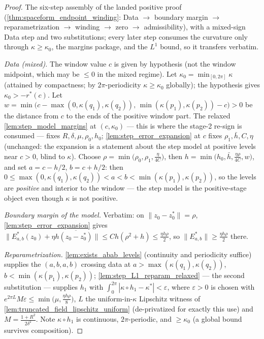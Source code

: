 \begin{proof}
        \leanok
  The six-step assembly of the landed positive proof
  (\cref{thm:spaceform_endpoint_winding}: Data $\to$ boundary margin $\to$
  reparametrization $\to$ winding $\to$ zero $\to$ admissibility), with a
  mixed-sign Data step and two substitutions; every later step consumes the
  curvature only through $\kappa\ge\kappa_0$, the margins package, and the
  $L^1$ bound, so it transfers verbatim.

  \emph{Data (mixed).} The window value $c$ is given by hypothesis (not the
  window midpoint, which may be $\le0$ in the mixed regime). Let
  $\kappa_0=\min_{[0,2\pi]}\kappa$ (attained by compactness; by
  $2\pi$-periodicity $\kappa\ge\kappa_0$ globally); the hypothesis gives
  $\kappa_0>-r^\ast(c)$. Let
  $w=\min\bigl(c-\max(0,\kappa(q_1),\kappa(q_2)),\,
  \min(\kappa(p_1),\kappa(p_2))-c\bigr)>0$ be the distance from $c$ to the
  ends of the positive window part. The relaxed
  \cref{lem:step_model_margins} at $(c,\kappa_0)$ — this is where the
  stage-2 re-sign is consumed — fixes $R,\delta,\mu,\rho_0,h_0$;
  \cref{lem:step_error_expansion} at $c$ fixes $\rho_1,\bar h,C,\eta$
  (unchanged: the expansion is a statement about the step model at positive
  levels near $c>0$, blind to $\kappa$). Choose
  $\rho=\min\bigl(\rho_0,\rho_1,\tfrac{\eta}{4C}\bigr)$, then
  $h=\min\bigl(h_0,\bar h,\tfrac{\eta\rho}{4C},w\bigr)$, and set
  $a=c-h/2$, $b=c+h/2$: then
  $0\le\max(0,\kappa(q_1),\kappa(q_2))<a<b<\min(\kappa(p_1),\kappa(p_2))$,
  so the levels are \emph{positive} and interior to the window — the step
  model is the positive-stage object even though $\kappa$ is not positive.

  \emph{Boundary margin of the model.} Verbatim: on
  $\|z_0-z_0^\ast\|=\rho$, \cref{lem:step_error_expansion} gives
  $\|E^\ast_{a,b}(z_0)+\eta h\overline{(z_0-z_0^\ast)}\|\le
  Ch(\rho^2+h)\le\tfrac{\eta h\rho}{2}$, so
  $\|E^\ast_{a,b}\|\ge\tfrac{\eta h\rho}{2}$ there.

  \emph{Reparametrization.} \cref{lem:exists_abab_levels} (continuity and
  periodicity suffice) supplies the $(a,b,a,b)$ crossing data at
  $a>\max(\kappa(q_1),\kappa(q_2))$, $b<\min(\kappa(p_1),\kappa(p_2))$;
  \cref{lem:step_L1_reparam_relaxed} — the second substitution — supplies
  $h_1$ with $\int_0^{2\pi}|\kappa\circ h_1-\kappa^\ast|<\varepsilon$, where
  $\varepsilon>0$ is chosen with
  $e^{2\pi L}M\varepsilon\le\min\bigl(\mu,\tfrac{\eta h\rho}{8}\bigr)$, $L$
  the uniform-in-$\kappa$ Lipschitz witness of
  \cref{lem:truncated_field_lipschitz_uniform} (de-privatized for exactly
  this use) and $M=\tfrac{1+R^2}{2\delta^2}$. Note $\kappa\circ h_1$ is
  continuous, $2\pi$-periodic, and $\ge\kappa_0$ (a global bound survives
  composition).


\end{proof}
